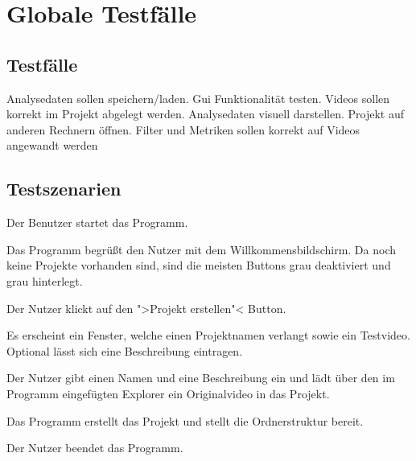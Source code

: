 \chapter{Globale Testfälle}
\section{Testfälle}
\setcounter{counterKriterien}{0}
 Analysedaten sollen speichern/laden.
 Gui Funktionalität testen.
 Videos sollen korrekt im Projekt abgelegt werden.
 Analysedaten visuell darstellen.
 Projekt auf anderen Rechnern öffnen.
 Filter und Metriken sollen korrekt auf Videos angewandt werden

\section{Testszenarien}
\setcounter{counterKriterien}{0}
   \begin{compactenum}[1]
\item Der Benutzer startet das Programm.
\item Das Programm begrüßt den Nutzer mit dem Willkommensbildschirm. Da noch keine Projekte vorhanden sind, sind die meisten Buttons grau deaktiviert und grau hinterlegt.
\item Der Nutzer klickt auf den ">Projekt erstellen"< Button.
\item Es erscheint ein Fenster, welche einen Projektnamen verlangt sowie ein Testvideo. Optional lässt sich eine Beschreibung eintragen.
\item Der Nutzer gibt einen Namen und eine Beschreibung ein und lädt über den im Programm eingefügten Explorer ein Originalvideo in das Projekt.
\item Das Programm erstellt das Projekt und stellt die Ordnerstruktur bereit.
\item Der Nutzer beendet das Programm.

\end{compactenum}

